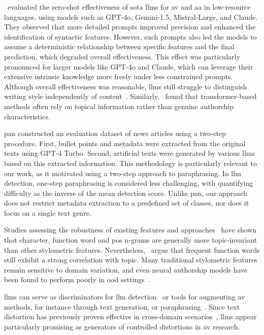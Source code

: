 \citet{schmidt_llm_av_latin_24}\ evaluated the zero-shot effectiveness of \acl{sota} \acp{llm} for \ac{av} and \ac{aa} in low-resource languages, using models such as GPT-4o, Gemini-1.5, Mistral-Large, and Claude. 
They observed that more detailed prompts improved precision and enhanced the identification of syntactic features. 
However, such prompts also led the models to assume a deterministic relationship between specific features and the final prediction, which degraded overall effectiveness. 
This effect was particularly pronounced for larger models like GPT-4o and Claude, which can leverage their extensive intrinsic knowledge more freely under less constrained prompts. 
Although overall effectiveness was reasonable, \acp{llm} still struggle to distinguish writing style independently of content~\citep{schmidt_llm_av_latin_24}. 
Similarly, \citet{nguyen_bert_topic_av_2023}\ found that transformer-based methods often rely on topical information rather than genuine authorship characteristics.

\acs{pan} constructed an evaluation dataset of news articles using a two-step procedure.
First, bullet points and metadata were extracted from the original texts using GPT-4 Turbo.
Second, artificial texts were generated by various \acp{llm} based on this extracted information. 
This methodology is particularly relevant to our work, as it motivated using a two-step approach to paraphrasing. 
In \ac{llm} detection, one-step paraphrasing is considered less challenging, with \citet{bevendorff_overview_2024} quantifying difficulty as the inverse of the mean detection score.
Unlike \acs{pan}, our approach does not restrict metadata extraction to a predefined set of classes, nor does it focus on a single text genre. 

Studies assessing the robustness of existing features and approaches~\citep{stamatatos_survey_2009,barlas_cross_domain_2020} have shown that character, function word and \ac{pos} n-grams are generally more topic-invariant than other stylometric features.
Nevertheless, \citet{bischoff_importance_2020}\ argue that frequent function words still exhibit a strong correlation with topic.
Many traditional stylometric features remain sensitive to domain variation, and even neural authorship models have been found to perform poorly in \ac{ood} settings~\citep{rivera_soto_learning_2021}.

\acp{llm} can serve as discriminators for \ac{llm} detection~\citep{futrzynski_pairwise_2021} or tools for augmenting \ac{av} methods, for instance through text generation, or paraphrasing~\citep{mao_raidar_2024,baradia_mirror_2025}.
Since text distortion has previously proven effective in cross-domain scenarios~\citep{bischoff_importance_2020}, \acp{llm} appear particularly promising as generators of controlled distortions in \ac{av} research.


